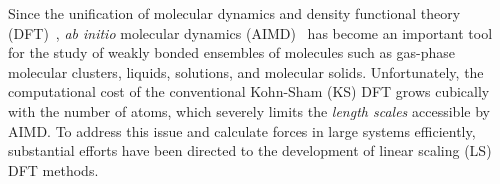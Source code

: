 \documentclass[aps,prl,reprint,amsmath,amssymb]{revtex4-1}
\begin{document}
\maketitle


Since the unification of molecular dynamics and density functional theory (DFT)~\cite{a:thecpmd},
\emph{ab initio} molecular dynamics (AIMD)~\cite{b:aimd} has become an important tool for the study of weakly bonded ensembles of molecules such as gas-phase molecular clusters, liquids, solutions, and molecular solids. %
Unfortunately, the computational cost of the conventional Kohn-Sham (KS) DFT grows cubically with the number of atoms, which severely limits the \emph{length scales} accessible by AIMD. %
To address this issue and calculate forces in large systems efficiently, substantial efforts have been directed to the development of linear scaling (LS) DFT methods.
\end{document}
